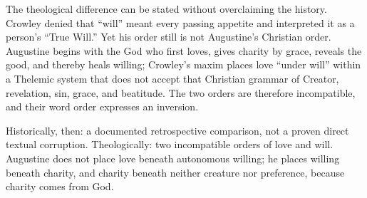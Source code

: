 The theological difference can be stated without overclaiming the history. Crowley denied that ``will'' meant every passing appetite and interpreted it as a person's ``True Will.'' Yet his order still is not Augustine's Christian order. Augustine begins with the God who first loves, gives charity by grace, reveals the good, and thereby heals willing; Crowley's maxim places love ``under will'' within a Thelemic system that does not accept that Christian grammar of Creator, revelation, sin, grace, and beatitude. The two orders are therefore incompatible, and their word order expresses an inversion.

Historically, then: a documented retrospective comparison, not a proven direct
textual corruption. Theologically: two incompatible orders of love and will.
Augustine does not place love beneath autonomous willing; he places willing
beneath charity, and charity beneath neither creature nor preference, because
charity comes from God.
